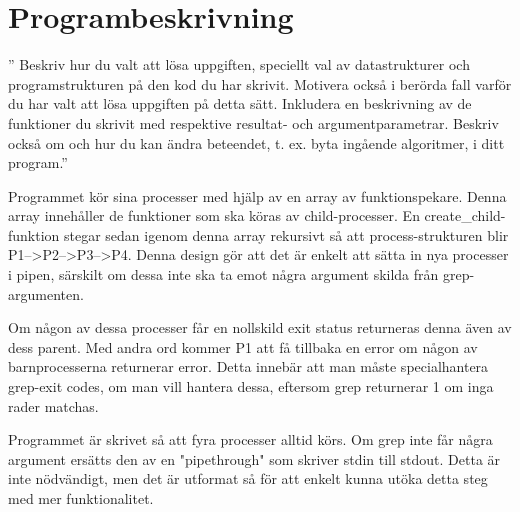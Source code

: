 \documentclass[paper=a4, fontsize=11pt]{scrartcl} %
\numberwithin{equation}{section} %
\numberwithin{figure}{section} %
\numberwithin{table}{section} %
\begin{document}
\section{Programbeskrivning}

'' Beskriv hur du valt att lösa uppgiften, speciellt val av datastrukturer och
programstrukturen på den kod du har skrivit. Motivera också i berörda fall
varför du har valt att lösa uppgiften på detta sätt. Inkludera en beskrivning
av de funktioner du skrivit med respektive resultat- och argumentparametrar.
Beskriv också om och hur du kan ändra beteendet, t. ex. byta ingående
algoritmer, i ditt program.''

Programmet kör sina processer med hjälp av en array av funktionspekare. Denna
array innehåller de funktioner som ska köras av child-processer.
En create\_child-funktion stegar sedan igenom denna array rekursivt så att
process-strukturen blir P1-->P2-->P3-->P4. Denna design gör att det är enkelt
att sätta in nya processer i pipen, särskilt om dessa inte ska ta emot några
argument skilda från grep-argumenten. %

Om någon av dessa processer får en nollskild exit status returneras denna även
av dess parent. Med andra ord kommer P1 att få tillbaka en error om någon av
barnprocesserna returnerar error. Detta innebär att man måste specialhantera
grep-exit codes, om man vill hantera dessa, eftersom grep returnerar 1 om inga
rader matchas. %

Programmet är skrivet så att fyra processer alltid körs. Om grep inte får
några argument ersätts den av en "pipethrough" som skriver stdin till stdout.
Detta är inte nödvändigt, men det är utformat så för att enkelt kunna utöka
detta steg med mer funktionalitet.





\end{document}
